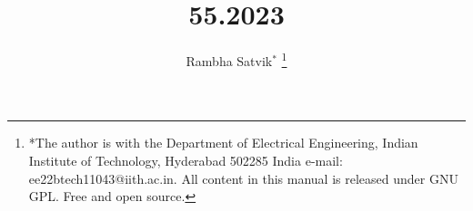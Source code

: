 \documentclass[journal,12pt,twocolumn]{IEEEtran}
\theoremstyle{remark}
\begin{document}
%




\vspace{3cm}

\title{55.2023}
\author{ Rambha Satvik$^{*}$%
	\thanks{*The author is with the Department
		of Electrical Engineering, Indian Institute of Technology, Hyderabad
		502285 India e-mail: ee22btech11043@iith.ac.in. All content in this manual is released under GNU GPL.  Free and open source.}
	
}	


%
%
%

% 
%



% 
\end{document}
